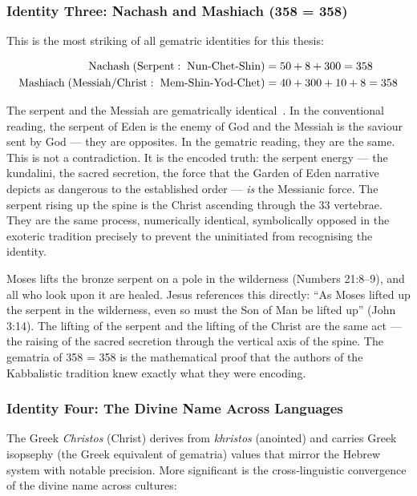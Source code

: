 \documentclass[12pt, a4paper]{article}
\begin{document}
\subsubsection{Identity Three: Nachash and Mashiach (358 = 358)}

This is the most striking of all gematric identities for this thesis:

\begin{align}
\text{Nachash} \; (\text{Serpent}: \;\text{Nun-Chet-Shin}) &= 50 + 8 + 300 = 358 \notag \\
\text{Mashiach} \; (\text{Messiah/Christ}: \;\text{Mem-Shin-Yod-Chet}) &= 40 + 300 + 10 + 8 = 358 \notag
\end{align}

The serpent and the Messiah are gematrically identical~\autocite{blumenthal2006}.
In the conventional reading, the serpent of Eden is the enemy of God and the
Messiah is the saviour sent by God — they are opposites. In the gematric
reading, they are the same. This is not a contradiction. It is the encoded
truth: the serpent energy — the kundalini, the sacred secretion, the force
that the Garden of Eden narrative depicts as dangerous to the established order
— \emph{is} the Messianic force. The serpent rising up the spine is the
Christ ascending through the 33 vertebrae. They are the same process,
numerically identical, symbolically opposed in the exoteric tradition precisely
to prevent the uninitiated from recognising the identity.

Moses lifts the bronze serpent on a pole in the wilderness (Numbers 21:8--9),
and all who look upon it are healed. Jesus references this directly: ``As Moses
lifted up the serpent in the wilderness, even so must the Son of Man be lifted
up'' (John 3:14). The lifting of the serpent and the lifting of the Christ are
the same act — the raising of the sacred secretion through the vertical axis
of the spine. The gematria of 358 = 358 is the mathematical proof that the
authors of the Kabbalistic tradition knew exactly what they were encoding.

\subsubsection{Identity Four: The Divine Name Across Languages}

The Greek \emph{Christos} (Christ) derives from \emph{khristos} (anointed)
and carries Greek isopsephy (the Greek equivalent of gematria) values that
mirror the Hebrew system with notable precision. More significant is the
cross-linguistic convergence of the divine name across cultures:
\end{document}
